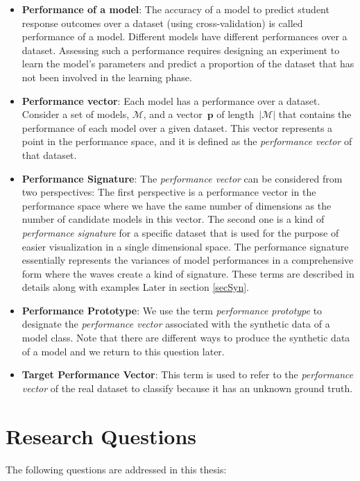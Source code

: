 \begin{itemize}
\item \textbf{Performance of a model}: The accuracy of a model to predict student response outcomes over a dataset (using cross-validation) is called performance of a model. Different models have different performances over a dataset. Assessing such a performance requires designing an experiment to learn the model's parameters and predict a proportion of the dataset that has not been involved in the learning phase.
\item \textbf{Performance vector}: Each model has a performance over a dataset. Consider a set of models, $\mathcal{M}$, and a vector~$\mathbf{p}$ of length~$|\mathcal{M}|$ that contains the performance of each model over a given dataset. This vector represents a point in the performance space, and it is defined as the \textit{performance vector} of that dataset.

\item \textbf{Performance Signature}: The \textit{performance vector} can be considered from two perspectives: The first perspective is a performance vector in the performance space where we have the same number of dimensions as the number of candidate models in this vector. The second one is a kind of \textit{performance signature} for a specific dataset that is used for the purpose of easier visualization in a single dimensional space. The performance signature essentially represents the variances of model performances in a comprehensive form where the waves create a kind of signature. These terms are described in details along with examples Later in section \ref{secSyn}.

\item \textbf{Performance Prototype}: We use the term \textit{performance prototype} to designate the \textit{performance vector} associated with the synthetic data of a model class. Note that there are different ways to produce the synthetic data of a model and we return to this question later.

\item \textbf{Target Performance Vector}: This term is used to refer to the \textit{performance vector} of the real dataset to classify because it has an unknown ground truth.


\end{itemize}

\section{Research Questions}
\paragraph{}The following questions are addressed in this thesis:

